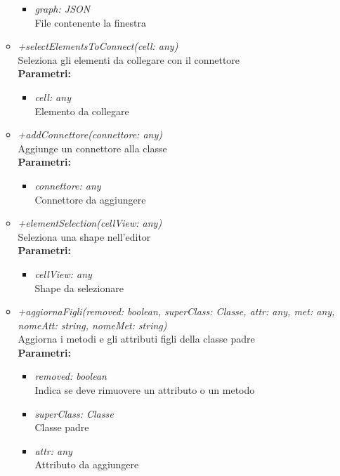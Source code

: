 \begin{itemize}
\begin{itemize}
\begin{itemize}
    			\item \emph{graph: JSON}\\
    			File contenente la finestra
    		\end{itemize}
    		\item \emph{+selectElementsToConnect(cell: any)}\\
    		Seleziona gli elementi da collegare con il connettore\\
    		\textbf{Parametri:}
    		\begin{itemize}
    			\item \emph{cell: any}\\
    			Elemento da collegare
    		\end{itemize}
    		\item \emph{+addConnettore(connettore: any)}\\
    		Aggiunge un connettore alla classe\\
    		\textbf{Parametri:}
    		\begin{itemize}
    			\item \emph{connettore: any}\\
    			Connettore da aggiungere
    		\end{itemize}
    		\item \emph{+elementSelection(cellView: any)}\\
    		Seleziona una shape nell'editor\\
    		\textbf{Parametri:}
    		\begin{itemize}
    			\item \emph{cellView: any}\\
    			Shape da selezionare
    		\end{itemize}
    		\item \emph{+aggiornaFigli(removed: boolean, superClass: Classe, attr: any, met: any, nomeAtt: string, nomeMet: string)}\\
    		Aggiorna i metodi e gli attributi figli della classe padre\\
    		\textbf{Parametri:}
    		\begin{itemize}
    			\item \emph{removed: boolean}\\
    			Indica se deve rimuovere un attributo o un metodo
    			\item \emph{superClass: Classe}\\
    			Classe padre
    			\item \emph{attr: any}\\
    			Attributo da aggiungere

\end{itemize}
\end{itemize}
\end{itemize}
